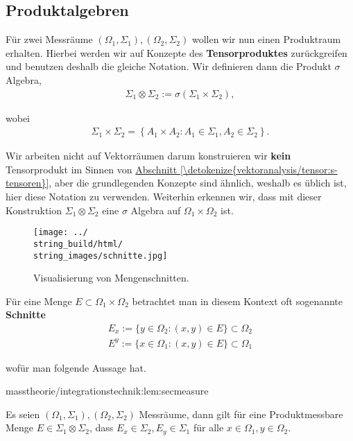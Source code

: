\documentclass[letterpaper,10pt,german]{jupyterBook}
\begin{document}
\subsection{Produktalgebren}
\label{\detokenize{masstheorie/integrationstechnik:produktalgebren}}
\par
Für zwei Messräume \((\Omega_1,\Sigma_1), (\Omega_2,\Sigma_2)\) wollen wir nun einen Produktraum erhalten. Hierbei werden wir auf Konzepte des \textbf{Tensorproduktes} zurückgreifen und benutzen deshalb die gleiche Notation. Wir definieren dann die Produkt \(\sigma\) Algebra,
\begin{align*}
\Sigma_1\otimes\Sigma_2 := \sigma\left(\Sigma_1\times\Sigma_2\right),
\end{align*}
\par
wobei
\begin{align*}
\Sigma_1\times\Sigma_2 = \left\{A_1\times A_2: A_1\in\Sigma_1, A_2\in\Sigma_2\right\}.
\end{align*}
\par
Wir arbeiten nicht auf Vektorräumen darum konstruieren wir \textbf{kein} Tensorprodukt im Sinnen von \hyperref[\detokenize{vektoranalysis/tensor:s-tensoren}]{Abschnitt \ref{\detokenize{vektoranalysis/tensor:s-tensoren}}}, aber die grundlegenden Konzepte sind ähnlich, weshalb es üblich ist, hier diese Notation zu verwenden. Weiterhin erkennen wir, dass mit dieser Konstruktion \(\Sigma_1\otimes\Sigma_2 \) eine \(\sigma\) Algebra auf \(\Omega_1\times\Omega_2\) ist.

\begin{figure}[htbp]
\centering


\noindent\texttt{[image: ../\\string\_build/html/\\string\_images/schnitte.jpg]}
\caption{Visualisierung von Mengenschnitten.}\label{\detokenize{masstheorie/integrationstechnik:fig-schnitte}}\end{figure}

\par
Für eine Menge \(E\subset\Omega_1\times\Omega_2\) betrachtet man in diesem Kontext oft sogenannte \textbf{Schnitte}
\begin{align*}
E_x := \{y\in \Omega_2: (x,y)\in E\}\subset\Omega_2\\
E^y := \{x\in \Omega_1: (x,y)\in E\}\subset\Omega_1
\end{align*}
\par
wofür man folgende Aussage hat.
\begin{lemma}{}{masstheorie/integrationstechnik:lem:secmeasure}



\par
Es seien \((\Omega_1,\Sigma_1), (\Omega_2,\Sigma_2)\) Messräume, dann gilt für eine Produktmessbare Menge \(E\in \Sigma_1\otimes\Sigma_2\), dass \(E_x\in \Sigma_2, E_y\in\Sigma_1\) für alle \(x\in\Omega_1,y\in\Omega_2\).
\end{lemma}
\end{document}
